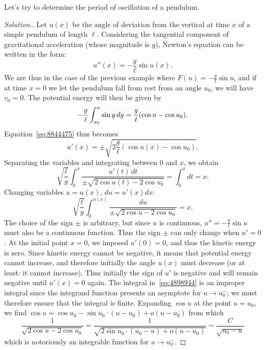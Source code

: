 \begin{example}
%
%
%
%
Let's try to determine the period of oscillation of a pendulum.
\end{example}
\begin{proof}[Solution.]
Let $u(x)$ be the angle of deviation from the vertical at time $x$ of a simple
pendulum of length $\ell$.
Considering the tangential component of gravitational acceleration (whose
magnitude is $g$), Newton's equation can be written in the form:
\[
  u''(x) = -\frac{g}{\ell} \sin u(x).
\]
We are thus in the case of the previous example where $F(u) = -\frac{g}{\ell}
\sin u$, and if at time $x=0$ we let the pendulum fall from rest from an angle
$u_0$, we will have $v_0=0$. The potential energy will then be given by
\[
-\frac{g}{\ell}\int_{u_0}^u \sin y\, dy = \frac{g}{\ell}{\left( \cos u - \cos
u_0 \right)}.
\]
Equation~\eqref{eq:8844475} thus becomes
\[
  u'(x) = \pm \sqrt{2\frac{g}{\ell}(\cos u(x) - \cos u_0)}.
\]
Separating the variables and integrating between $0$ and $x$, we obtain
\[
\sqrt{\frac \ell g}\int_0^x \frac{u'(t)\, dt}{\pm\sqrt{2\cos u(t)-2\cos u_0}}
= \int_0^x dt  = x.
\]
Changing variables $u=u(x)$, $du = u'(x) dx$:
\begin{equation}\label{eq:4898944}
\sqrt{\frac \ell g}\int_0^{u(x)} \frac{du}{\pm\sqrt{2\cos u-2\cos u_0}} = x.
\end{equation}
The choice of the sign $\pm$ is arbitrary, but since $u$ is continuous,
$u''=-\frac g l \sin u$ must also be a continuous function. Thus the sign $\pm$
can only change when $u'=0$. At the initial point $x=0$, we imposed $u'(0) = 0$,
and thus the kinetic energy is zero. Since kinetic energy cannot be negative, it
means that potential energy cannot increase, and therefore initially the angle
$u(x)$ must decrease (or at least: it cannot increase). Thus initially the sign
of $u'$ is negative and will remain negative until $u'(x)=0$ again.
The integral in~\eqref{eq:4898944} is an improper integral since the integrand
function presents an asymptote for $u\to u_0^-$; we must therefore ensure that
the integral is finite. Expanding $\cos u$ at the point $u=u_0$, we find $\cos u
= \cos u_0  - \sin u_0 \cdot (u-u_0) + o(u-u_0)$ from which
\[
 \frac{1}{\sqrt{2 \cos u - 2 \cos u_0}}
 =\frac{1}{\sqrt{2\sin u_0\cdot (u_0-u) + o(u-u_0)}}
 \sim \frac{C}{\sqrt{u_0-u}}
\]
which is notoriously an integrable function for $u\to u_0^-$.


\end{proof}

